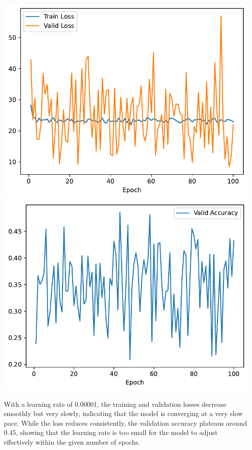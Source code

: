 \documentclass[12pt,a4paper]{article}
\begin{document}
\begin{itemize}
                \includegraphics[width=\imagewidth]{q2/q2_1_lr-0.1-training-loss.pdf}
                \includegraphics[width=\imagewidth]{q2/q2_1_lr-0.1-validation-accuracy.pdf}
        \end{itemize}
        \newpage
        \noindent With a learning rate of 0.00001, the training and validation losses decrease smoothly but very slowly, indicating that the model is converging at a very slow pace. While the loss reduces consistently, the validation accuracy plateaus around 0.45, showing that the learning rate is too small for the model to adjust effectively within the given number of epochs. \\
\end{document}
